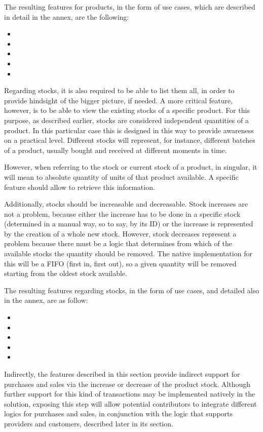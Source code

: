 The resulting features for products, in the form of use cases, which are described in detail in the annex, are the following:
\hfill\break
\begin{itemize}
\item {}
\item {}
\item {}
\item {}
\item {}
\end{itemize}
\hfill\break
Regarding stocks, it is also required to be able to list them all, in order to provide hindsight of the bigger picture, if needed. A more critical feature, however, is to be able to view the existing stocks of a specific product. For this purpose, as described earlier, stocks are considered independent quantities of a product. In this particular case this is designed in this way to provide awareness on a practical level. Different stocks will represent, for instance, different batches of a product, usually bought and received at different moments in time.

However, when referring to the stock or current stock of a product, in singular, it will mean to absolute quantity of units of that product available. A specific feature should allow to retrieve this information.

Additionally, stocks should be increasable and decreasable. Stock increases are not a problem, because either the increase has to be done in a specific stock (determined in a manual way, so to say, by its ID) or the increase is represented by the creation of a whole new stock. However, stock decreases represent a problem because there must be a logic that determines from which of the available stocks the quantity should be removed. The native implementation for this will be a FIFO (first in, first out), so a given quantity will be removed starting from the oldest stock available.

The resulting features regarding stocks, in the form of use cases, and detailed also in the annex, are as follow:
\hfill\break
\begin{itemize}
\item {}
\item {}
\item {}
\item {}
\item {}
\end{itemize}
\hfill\break
Indirectly, the features described in this section provide indirect support for purchases and sales via the increase or decrease of the product stock. Although further support for this kind of transactions may be implemented natively in the solution, exposing this step will allow potential contributors to integrate different logics for purchases and sales, in conjunction with the logic that supports providers and customers, described later in its section.

